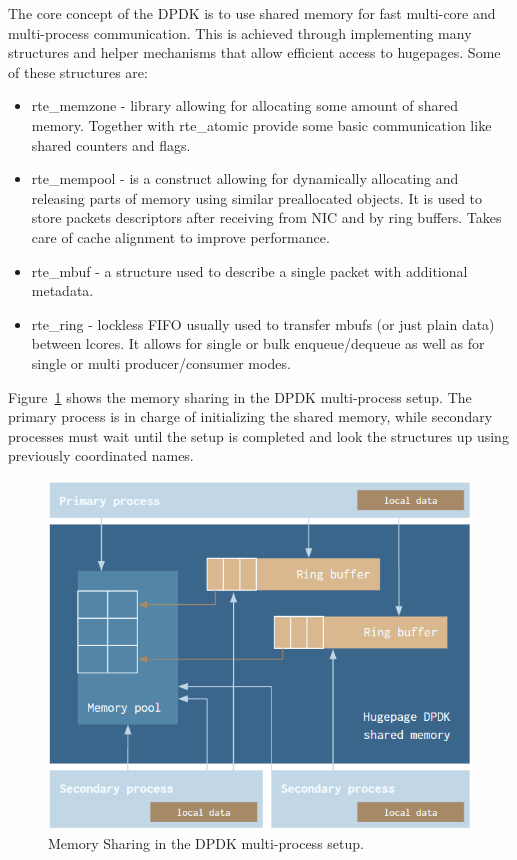 \documentclass[english]{kththesis}
\begin{document}
The core concept of the DPDK is to use shared memory for fast multi-core and multi-process communication. This is achieved through implementing many structures and helper mechanisms that allow efficient access to hugepages. Some of these structures are:
\begin{itemize}
    \item rte\_memzone - library allowing for allocating some amount of shared memory. Together with rte\_atomic provide some basic communication like shared counters and flags.
    \item rte\_mempool - is a construct allowing for dynamically allocating and releasing parts of memory using similar preallocated objects. It is used to store packets descriptors after receiving from \gls{NIC} and by ring buffers. Takes care of cache alignment to improve performance.
    \item rte\_mbuf - a structure used to describe a single packet with additional metadata.
    \item rte\_ring - lockless FIFO usually used to transfer mbufs (or just plain data) between lcores. It allows for single or bulk enqueue/dequeue as well as for single or multi producer/consumer modes.
\end{itemize}
Figure~\ref{fig:sharedmem} shows the memory sharing in the DPDK multi-process setup. The primary process is in charge of initializing the shared memory, while secondary processes must wait until the setup is completed and look the structures up using previously coordinated names.
\begin{figure}[!ht]
  \centering
    \includegraphics[width=1\textwidth, height=0.72\textwidth]{Fig5}
  \caption{Memory Sharing in the DPDK multi-process setup.}
  \label{fig:sharedmem}
\end{figure}
\end{document}

